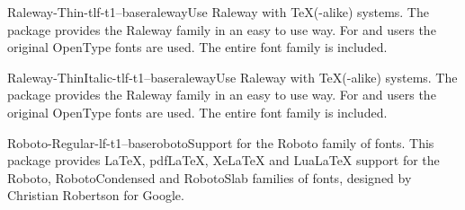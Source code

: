 \documentclass{ddltxtyp}
\begin{document}
\begin{package}{Raleway-Thin-tlf-t1--base}{raleway}{Use Raleway with {\TeX}(-alike) systems.}
The package provides the Raleway family in an easy to use way.
For {\XeLaTeX} and {\LuaLaTeX} users the original OpenType fonts are
used. The entire font family is included.
\end{package}
\begin{package}{Raleway-ThinItalic-tlf-t1--base}{raleway}{Use Raleway with {\TeX}(-alike) systems.}
The package provides the Raleway family in an easy to use way.
For {\XeLaTeX} and {\LuaLaTeX} users the original OpenType fonts are
used. The entire font family is included.
\end{package}


\begin{package}{Roboto-Regular-lf-t1--base}{roboto}{Support for the Roboto family of fonts.}
This package provides LaTeX, pdfLaTeX, XeLaTeX and LuaLaTeX
support for the Roboto, RobotoCondensed and RobotoSlab families
of fonts, designed by Christian Robertson for Google.
\end{package}

\end{document}
